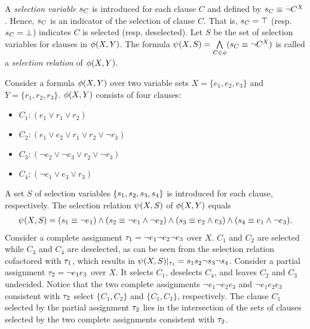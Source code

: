 A \textit{selection variable} $s_{C}$ is introduced for each clause $C$ and defined by $s_{C}\equiv\lnot C^X$.
Hence, $s_{C}$ is an indicator of the selection of clause $C$.
That is, $s_{C}=\top$ (resp. $s_{C}=\bot$) indicates $C$ is selected (resp. deselected).
Let $S$ be the set of selection variables for clauses in $\phi(X,Y)$.
The formula $\psi(X,S)=\bigwedge\limits_{C\in\phi}(s_{C}\equiv\lnot C^X)$ is called a \textit{selection relation} of $\phi(X,Y)$.

\begin{example}
    \label{ex:erssat-select}
    Consider a formula $\phi(X,Y)$ over two variable sets $X=\{e_1,e_2,e_3\}$ and $Y=\{r_1,r_2,r_3\}$.
    $\phi(X,Y)$ consists of four clauses:
    \begin{itemize}
        \item[] $C_1: (e_1 \lor r_1 \lor r_2)$
        \item[] $C_2: (e_1 \lor e_2 \lor r_1 \lor r_2 \lor \lnot r_3)$
        \item[] $C_3: (\lnot e_2 \lor \lnot e_3 \lor r_2 \lor \lnot r_3)$
        \item[] $C_4: (\lnot e_1 \lor e_3 \lor r_3)$
    \end{itemize}
    A set $S$ of selection variables $\{s_{1},s_{2},s_{3},s_{4}\}$ is introduced for each clause, respectively.
    The selection relation $\psi(X,S)$ of $\phi(X,Y)$ equals
    \begin{align*}
        \psi(X,S)=
        (s_{1} \equiv \lnot e_1) \land
        (s_{2} \equiv \lnot e_1 \land \lnot e_2) \land
        (s_{3} \equiv e_2 \land e_3) \land
        (s_{4} \equiv e_1 \land \lnot e_3).
    \end{align*}
    Consider a complete assignment $\tau_1=\lnot e_1 \lnot e_2 \lnot e_3$ over $X$.
    $C_1$ and $C_2$ are selected while $C_3$ and $C_4$ are deselected,
    as can be seen from the selection relation cofactored with $\tau_1$,
    which results in $\psi(X,S)|_{\tau_1}=s_1s_2\neg s_3 \neg s_4$.
    Consider a partial assignment $\tau_2=\lnot e_1 e_3$ over $X$.
    It selects $C_1$, deselects $C_4$, and leaves $C_2$ and $C_3$ undecided.
    Notice that the two complete assignments $\lnot e_1 \lnot e_2 e_3$ and $\lnot e_1 e_2 e_3$ consistent with $\tau_2$ select $\{C_1, C_2\}$ and $\{C_1, C_3\}$, respectively.
    The clause $C_1$ selected by the partial assignment $\tau_2$ lies in the intersection of the sets of clauses selected by the two complete assignments consistent with $\tau_2$.
\end{example}